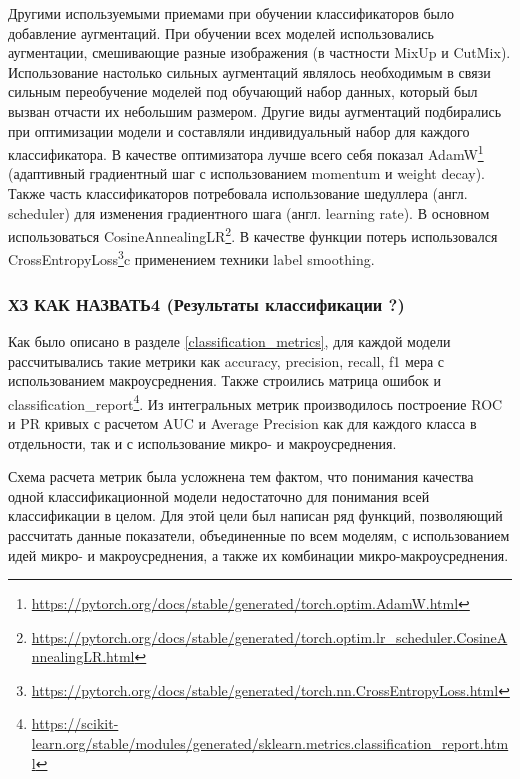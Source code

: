 \documentclass[a4paper,12pt]{extarticle}
\begin{document}
Другими используемыми приемами при обучении классификаторов было добавление аугментаций. При обучении всех моделей использовались аугментации, смешивающие разные изображения (в частности MixUp и CutMix\cite{cutmix}). Использование настолько сильных аугментаций являлось необходимым в связи сильным переобучение моделей под обучающий набор данных, который был вызван отчасти их небольшим размером. Другие виды аугментаций подбирались при оптимизации модели и составляли индивидуальный набор для каждого классификатора. В качестве оптимизатора лучше всего себя показал AdamW\footnote{\url{https://pytorch.org/docs/stable/generated/torch.optim.AdamW.html}} (адаптивный градиентный шаг с использованием momentum и weight decay). Также часть классификаторов потребовала использование шедуллера (англ. scheduler) для изменения градиентного шага (англ. learning rate). В основном использоваться CosineAnnealingLR\footnote{\url{https://pytorch.org/docs/stable/generated/torch.optim.lr_scheduler.CosineAnnealingLR.html}}. В качестве функции потерь использовался CrossEntropyLoss\footnote{\url{https://pytorch.org/docs/stable/generated/torch.nn.CrossEntropyLoss.html}}c применением техники label smoothing.

\subsubsection{ХЗ КАК НАЗВАТЬ4 (Результаты классификации ?)}

Как было описано в разделе \ref{classification_metrics}, для каждой модели рассчитывались такие метрики как accuracy, precision, recall, f1 мера с использованием макроусреднения. Также строились матрица ошибок и classification\_report\footnote{\url{https://scikit-learn.org/stable/modules/generated/sklearn.metrics.classification\_report.html}}. Из интегральных метрик производилось построение ROC и PR кривых с расчетом AUC и Average Precision как для каждого класса в отдельности, так и с использование микро- и макроусреднения.

Схема расчета метрик была усложнена тем фактом, что понимания качества одной классификационной модели недостаточно для понимания всей классификации в целом. Для этой цели был написан ряд функций, позволяющий рассчитать данные показатели, объединенные по всем моделям, с использованием идей микро- и макроусреднения, а также их комбинации микро-макроусреднения. 
\end{document}
